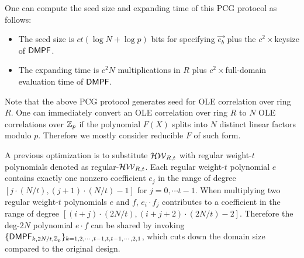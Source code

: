 One can compute the seed size and expanding time of this PCG protocol as follows: 
\begin{itemize}
    \item The seed size is $ct(\log N+\log p)$ bits for specifying $\vec{e_b}$ plus the $c^2\times $keysize of ${\sf DMPF}$. 
    \item The expanding time is $c^2N$ multiplications in $R$ plus $c^2\times$full-domain evaluation time of ${\sf DMPF}$. 
\end{itemize}

\begin{remark}\label{rem:use_reducible_ring}
    Note that the above PCG protocol generates seed for OLE correlation over ring $R$. One can immediately convert an OLE correlation over ring $R$ to $N$ OLE correlations over $\mathbb{Z}_p$ if the polynomial $F(X)$ splits into $N$ distinct linear factors modulo $p$. Therefore we mostly consider reducible $F$ of such form. 
\end{remark}

A previous optimization is to substitute $\mathcal{HW}_{R,t}$ with regular weight-$t$ polynomials denoted as regular-$\mathcal{HW}_{R,t}$. Each regular weight-$t$ polynomial $e$ contains exactly one nonzero coefficient $e_j$ in the range of degree $[j\cdot (N/t), (j+1)\cdot (N/t)-1]$ for $j=0,\cdots t-1$. When multiplying two regular weight-$t$ polynomials $e$ and $f$, $e_i\cdot f_j$ contributes to a coefficient in the range of degree $[(i+j)\cdot (2N/t), (i+j+2)\cdot (2N/t)-2]$. Therefore the deg-$2N$ polynomial $e\cdot f$ can be shared by invoking $\{{\sf DMPF}_{k, 2N/t, \mathbb{Z}_p}\}_{k=1,2,\cdots,t-1,t,t-1,\cdots, 2,1}$, which cuts down the domain size compared to the original design. 

